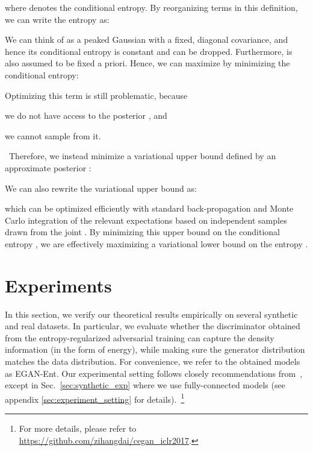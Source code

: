 \documentclass[a4paper]{article}
\begin{document}
where  denotes the conditional entropy. By reorganizing terms in this definition, we can write the entropy  as:

We can think of  as a peaked Gaussian with a fixed, diagonal covariance, and hence its conditional entropy is constant and can be dropped. Furthermore,  is also assumed to be fixed a priori. Hence, we can maximize  by minimizing the conditional entropy:

Optimizing this term is still problematic, because
\begin{inlinelist}
\item we do not have access to the posterior , and
\item we cannot sample from it.
\end{inlinelist}~Therefore, we instead minimize a variational upper bound defined by an approximate posterior :

We can also rewrite the variational upper bound as:

which can be optimized efficiently with standard back-propagation and Monte Carlo integration of the relevant expectations based on independent samples drawn from the joint . By minimizing this upper bound on the conditional entropy
, we are effectively maximizing a variational lower bound on the entropy .
%
 \section{Experiments}
\label{sec:experiments}
In this section, we verify our theoretical results empirically on several synthetic and real datasets.
In particular, we evaluate whether the discriminator obtained from the entropy-regularized adversarial training can capture the density information (in the form of energy), while making sure the generator distribution matches the data distribution. 
For convenience, we refer to the obtained models as EGAN-Ent.
Our experimental setting follows closely recommendations from~\cite{radford2015unsupervised}, except in Sec.~\ref{sec:synthetic_exp} where we use fully-connected models (see appendix \ref{sec:experiment_setting} for details).~\footnote{For more details, please refer to \url{https://github.com/zihangdai/cegan_iclr2017}.}
\end{document}
